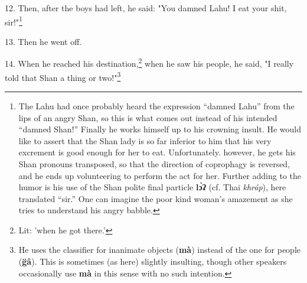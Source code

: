 12. Then, after the boys had left, he said: "You damned Lahu! I eat your
shit, sir!"\footnote{The Lahu had once probably heard the expression ``damned Lahu'' from the lips of an angry Shan, so this is what comes out instead of his intended ``damned Shan!'' Finally he works himself up to his crowning insult. He would like to assert that the Shan lady is so far inferior to him that his very excrement is good enough for her to eat. Unfortunately. however, he gets his Shan pronouns transposed, so that the direction of coprophagy is reversed, and he ends up volunteering to perform the act for her. Further adding to the humor is his use of the Shan polite final particle \textbf{lɔ̀ʔ} (cf. Thai \textit{khráp}), here translated ``sir.'' One can imagine the poor kind woman's amazement as she tries to understand his angry babble.}


13. Then he went off.

14. When he reached his destination,\footnote{Lit: 'when he got there.'} when he saw his people, he said, "I
really told that Shan a thing or two!"\footnote{He uses the classifier for inanimate objects (\textbf{mà}) instead of the one for people (\textbf{g̈â}). This is sometimes (as here) slightly insulting, though other speakers occasionally use \textbf{mà} in this sense with no such intention.}

